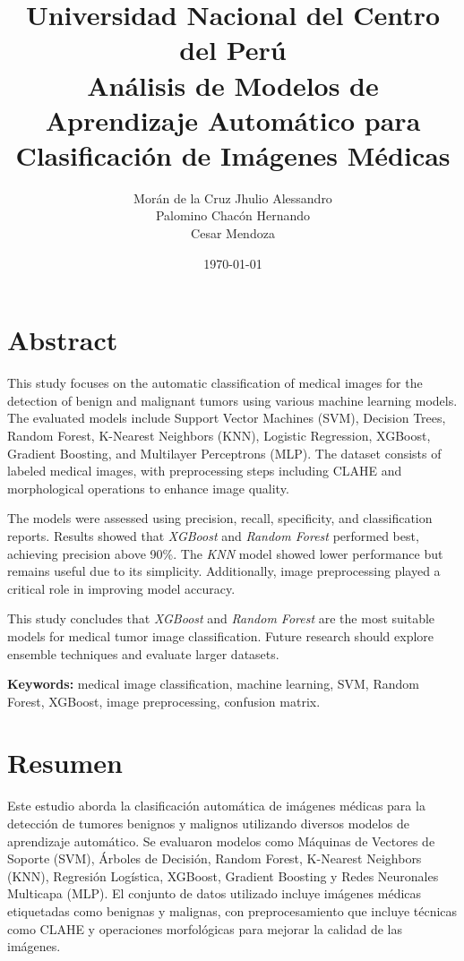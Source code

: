 \documentclass[12pt]{article}
\title{Universidad Nacional del Centro del Perú \\ \vspace{1em} Análisis de Modelos de Aprendizaje Automático para Clasificación de Imágenes Médicas}
\author{Morán de la Cruz Jhulio Alessandro \\ Palomino Chacón Hernando \\ Cesar Mendoza}
\date{\today}
\begin{document}
\maketitle

\section*{Abstract}
This study focuses on the automatic classification of medical images for the detection of benign and malignant tumors using various machine learning models. The evaluated models include Support Vector Machines (SVM), Decision Trees, Random Forest, K-Nearest Neighbors (KNN), Logistic Regression, XGBoost, Gradient Boosting, and Multilayer Perceptrons (MLP). The dataset consists of labeled medical images, with preprocessing steps including CLAHE and morphological operations to enhance image quality.

The models were assessed using precision, recall, specificity, and classification reports. Results showed that \textit{XGBoost} and \textit{Random Forest} performed best, achieving precision above 90\%. The \textit{KNN} model showed lower performance but remains useful due to its simplicity. Additionally, image preprocessing played a critical role in improving model accuracy.

This study concludes that \textit{XGBoost} and \textit{Random Forest} are the most suitable models for medical tumor image classification. Future research should explore ensemble techniques and evaluate larger datasets.

\textbf{Keywords:} medical image classification, machine learning, SVM, Random Forest, XGBoost, image preprocessing, confusion matrix.

\newpage

\section*{Resumen}
Este estudio aborda la clasificación automática de imágenes médicas para la detección de tumores benignos y malignos utilizando diversos modelos de aprendizaje automático. Se evaluaron modelos como Máquinas de Vectores de Soporte (SVM), Árboles de Decisión, Random Forest, K-Nearest Neighbors (KNN), Regresión Logística, XGBoost, Gradient Boosting y Redes Neuronales Multicapa (MLP). El conjunto de datos utilizado incluye imágenes médicas etiquetadas como benignas y malignas, con preprocesamiento que incluye técnicas como CLAHE y operaciones morfológicas para mejorar la calidad de las imágenes.
\end{document}
